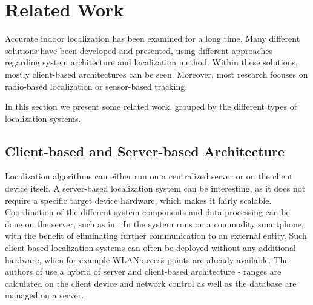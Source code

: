 
\chapter{Related Work} %

\label{Chapter2} %
Accurate indoor localization has been examined for a long time. Many different solutions have been developed and presented, using different approaches regarding system architecture and localization method. Within these solutions, mostly client-based architectures can be seen. Moreover, most research focuses on radio-based localization or sensor-based tracking.

In this section we present some related work, grouped by the different types of localization systems.


\section{Client-based and Server-based Architecture}
Localization algorithms can either run on a centralized server or on the client device itself. A server-based localization system can be interesting, as it does not require a specific target device hardware, which makes it fairly scalable. Coordination of the different system components and data processing can be done on the server, such as in \cite{Delmastro}.
In \cite{Carrera} the system runs on a commodity smartphone, with the benefit of eliminating further communication to an external entity. Such client-based localization systems can often be deployed without any additional hardware, when for example WLAN access points are already available. The authors of \cite{Guoguo} use a hybrid of server and client-based architecture - ranges are calculated on the client device and network control as well as the database are managed on a server. 

